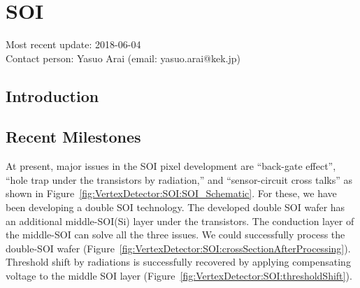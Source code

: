 \section{SOI}
Most recent update: 2018-06-04 \\
Contact person: Yasuo Arai (email: yasuo.arai@kek.jp)
\subsection{Introduction}
\subsection{Recent Milestones}
At present, major issues in the SOI pixel development are ``back-gate effect'', ``hole trap under the transistors by radiation,'' and ``sensor-circuit cross talks'' as shown in Figure~\ref{fig:VertexDetector:SOI:SOI_Schematic}. For these, we have been developing a double SOI technology. The developed double SOI wafer has an additional middle-SOI(Si) layer under the transistors. The conduction layer of the middle-SOI can solve all the three issues. We could successfully process the double-SOI wafer (Figure~\ref{fig:VertexDetector:SOI:crossSectionAfterProcessing}). Threshold shift by radiations is successfully recovered by applying compensating voltage to the middle SOI layer (Figure~\ref{fig:VertexDetector:SOI:thresholdShift}).

